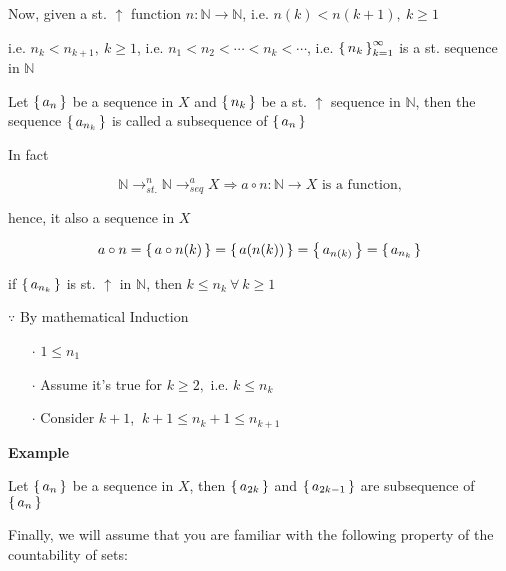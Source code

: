 Now, given a st. $\uparrow$ function $n:\mathbb N \rightarrow \mathbb N$, i.e. $n(k) < n(k+1),~k \geq 1$

i.e. $n_k < n_{k+1},~k \geq 1$, i.e. $n_1<n_2<\cdots<n_k<\cdots$, i.e. $\left\{ \,n_k \,\right\}^{\infty}_{k=1}$ is a st. sequence in $\mathbb N$

\begin{defn}
	Let $\left\{ \,a_n \,\right\}$ be a sequence in $X$ and $\left\{ \,n_k \,\right\}$ be a st. $\uparrow$ sequence in $\mathbb N$, then the sequence $\left\{ \,a_{n_k} \,\right\}$ is called a subsequence of $\left\{ \,a_n \,\right\}$
	
	In fact
	
	$$\mathbb N \rightarrow^{n}_{st.} \mathbb N \rightarrow^{a}_{seq} X  \Rightarrow a \circ n:\mathbb N \rightarrow X \text{ is a function,}$$
	
	hence, it also a sequence in $X$
	
	$$a \circ n = \left\{ \,a \circ n(k) \,\right\} = \left\{ \,a(n(k)) \,\right\} = \left\{ \,a_{n(k)} \,\right\} = \left\{ \,a_{n_k} \,\right\}$$
\end{defn}

\begin{rmk*}
	if $\left\{ \,a_{n_k} \,\right\}$ is st. $\uparrow$ in $\mathbb N$, then $k \leq n_k~\forall~k\geq 1$
	
	$\because$ By mathematical Induction
	
	\begin{enumerate}
		\item[$\cdot$] $1 \leq n_1$
		\item[$\cdot$] Assume it's true for $k \geq 2,$ i.e. $k \leq n_k$
		\item[$\cdot$] Consider $k+1$, $~k+1 \leq n_k + 1 \leq n_{k+1}$ 
	\end{enumerate}
	
	\textbf{Example}
	
	Let $\left\{ \,a_n \,\right\}$ be a sequence in $X$, then $\left\{ \,a_{2k} \,\right\}$ and $\left\{ \,a_{2k-1} \,\right\}$ are subsequence of $\left\{ \,a_n \,\right\}$
\end{rmk*}

Finally, we will assume that you are familiar with the following property of the countability of sets:

